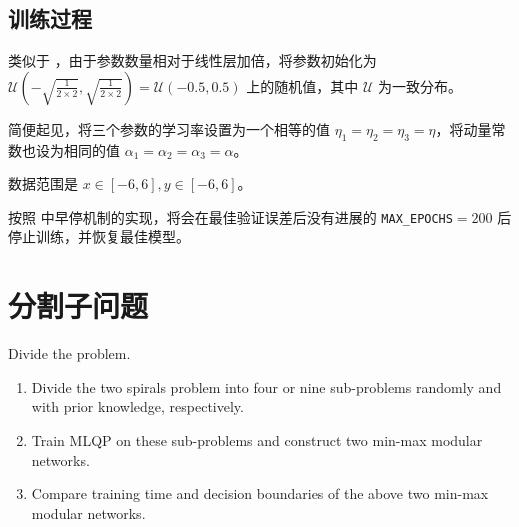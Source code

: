     \subsection{训练过程}

    类似于 \cite{torchlinear}，由于参数数量相对于线性层加倍，将参数初始化为 $\mathcal{U}\left(-\sqrt{\frac{1}{2\times 2}},\sqrt{\frac{1}{2\times 2}}\right)=\mathcal{U}(-0.5,0.5)$ 上的随机值，其中 $\mathcal{U}$ 为一致分布。

    简便起见，将三个参数的学习率设置为一个相等的值 $\eta_1=\eta_2=\eta_3=\eta$，将动量常数也设为相同的值 $\alpha_1=\alpha_2=\alpha_3=\alpha$。

    数据范围是 $x\in[-6,6],y\in[-6,6]$。

    按照 \cite{tfearly} 中早停机制的实现，将会在最佳验证误差后没有进展的 \texttt{MAX\_EPOCHS}$=200$ 后停止训练，并恢复最佳模型。

    \section{分割子问题}

    \begin{problem}
        Divide the problem.
        \begin{enumerate}
            \item Divide the two spirals problem into four or nine sub-problems randomly and with prior knowledge, respectively.
            \item Train MLQP on these sub-problems and construct two min-max modular networks.
            \item Compare training time and decision boundaries of the above two min-max modular networks.
        \end{enumerate}
    \end{problem}

    
